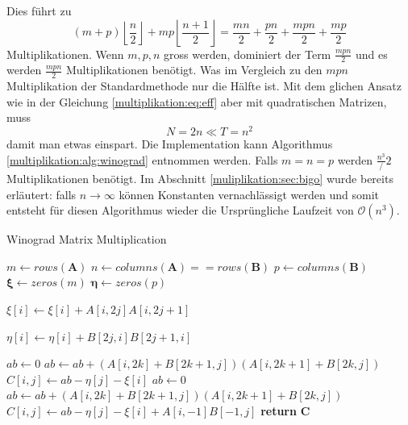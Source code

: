 Dies f\"uhrt zu
\begin{equation}
		(m+p) \left \lfloor \frac{n}{2} \right \rfloor + mp \left \lfloor \frac{n+1}{2} \right \rfloor = \frac{mn}{2} + \frac{pn}{2} + \frac{mpn}{2} + \frac{mp}{2}
\end{equation}
Multiplikationen.
Wenn $m,p,n$ gross werden, dominiert der Term $\frac{mpn}{2}$ und es werden $\frac{mpn}{2}$ Multiplikationen ben\"otigt.
Was im Vergleich zu den $mpn$ Multiplikation der Standardmethode nur die H\"alfte ist.
Mit dem glichen Ansatz wie in der Gleichung \ref{multiplikation:eq:eff} aber mit quadratischen Matrizen, muss
\begin{equation}
	N=2n \ll T=n^2
\end{equation}
damit man etwas einspart.
Die Implementation kann Algorithmus \ref{multiplikation:alg:winograd} entnommen werden.
Falls $m=n=p$ werden $\frac{n^3}/{2}$ Multiplikationen benötigt. Im Abschnitt \ref{muliplikation:sec:bigo} wurde bereits erläutert: falls $n \rightarrow \infty$ können Konstanten vernachlässigt werden und
 somit entsteht für diesen Algorithmus wieder die Ursprüngliche Laufzeit von $\mathcal{O}\left(n^3 \right)$.
\begin{algorithm}\footnotesize\caption{Winograd Matrix Multiplication}
	\setlength{\lineskip}{7pt}
	\label{multiplikation:alg:winograd}
	\begin{algorithmic}
		\State  $ m \gets rows(\mathbf{A})$
		\State  $ n \gets columns(\mathbf{A}) == rows(\mathbf{B})$
		\State  $ p \gets columns(\mathbf{B})$
		\State  $ \mathbf{\xi} \gets zeros(m)$
		\State  $ \mathbf{\eta} \gets zeros(p)$


		\State $\xi[i] \gets \xi[i]+A[i,2 j]A[i,2 j+1]$
		\EndFor
		\EndFor

		\State $\eta[i] \gets   \eta[i]+B[2 j,i]B[2 j+1,i]$
		\EndFor
		\EndFor

		\State $ab \gets 0$
		\State $ab \gets ab + (A[i,2k]+B[2k+1,j])(A[i,2k+1]+B[2k,j])$
		\EndFor
		\State $C[i,j] \gets ab-\eta[j]-\xi[i]$
		\EndFor
		\EndFor
    \Else
		\State $ab \gets 0$
		\State $ab \gets ab + (A[i,2k]+B[2k+1,j])(A[i,2k+1]+B[2k,j])$
		\EndFor
		\State $C[i,j] \gets ab-\eta[j]-\xi[i]+A[i,-1]B[-1,j]$
		\EndFor
		\EndFor
		\EndIf
		\State \textbf{return} $\textbf{C}$

		\EndFunction
	\end{algorithmic}
\end{algorithm}


